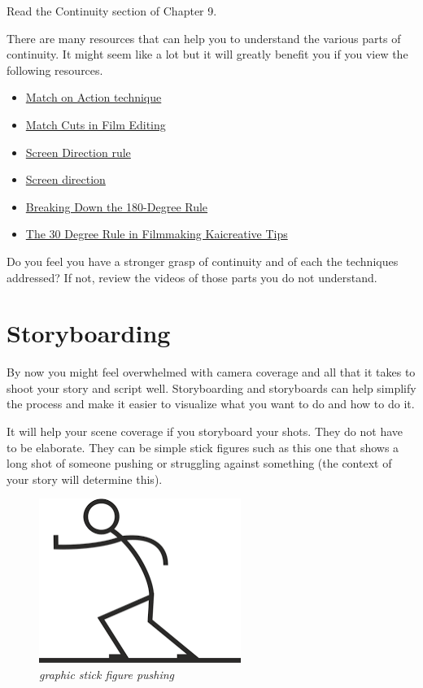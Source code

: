 \documentclass[
]{book}
\providecommand{\tightlist}{%
  \setlength{\itemsep}{0pt}\setlength{\parskip}{0pt}}
\begin{document}
\begin{reflect}
Read the Continuity section of Chapter 9.

There are many resources that can help you to understand the various parts of continuity. It might seem like a lot but it will greatly benefit you if you view the following resources.

\begin{itemize}
\tightlist
\item
  \href{https://www.youtube-nocookie.com/embed/eou7A-e2e4I}{Match on Action technique}
\item
  \href{https://www.youtube-nocookie.com/embed/El28XrjtcMI}{Match Cuts in Film Editing}
\item
  \href{https://www.youtube-nocookie.com/embed/9XOn5uxdSJc}{Screen Direction rule}
\item
  \href{https://www.youtube-nocookie.com/embed/RogoUz_pk4Y}{Screen direction}
\item
  \href{https://www.youtube-nocookie.com/embed/HinUychY3sE}{Breaking Down the 180-Degree Rule}
\item
  \href{https://www.youtube-nocookie.com/embed/1K8EUc98VoQ}{The 30 Degree Rule in Filmmaking \textbar{} Kaicreative \textbar{} Tips}
\end{itemize}

Do you feel you have a stronger grasp of continuity and of each the techniques addressed? If not, review the videos of those parts you do not understand.
\end{reflect}

\hypertarget{storyboarding}{%
\section{Storyboarding}\label{storyboarding}}

By now you might feel overwhelmed with camera coverage and all that it takes to shoot your story and script well. Storyboarding and storyboards can help simplify the process and make it easier to visualize what you want to do and how to do it.

It will help your scene coverage if you storyboard your shots. They do not have to be elaborate. They can be simple stick figures such as this one that shows a long shot of someone pushing or struggling against something (the context of your story will determine this).

\begin{figure}
\centering
\includegraphics{assets/unit5/Picture1.png}
\caption{\emph{graphic stick figure pushing}}
\end{figure}
\end{document}
